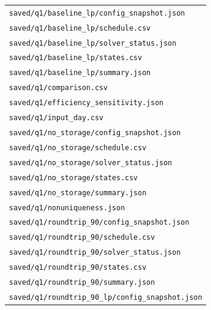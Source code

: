 \begin{longtable}{p{}}
\nolinkurl{saved/q1/baseline_lp/config_snapshot.json} \\

\nolinkurl{saved/q1/baseline_lp/schedule.csv} \\

\nolinkurl{saved/q1/baseline_lp/solver_status.json} \\

\nolinkurl{saved/q1/baseline_lp/states.csv} \\

\nolinkurl{saved/q1/baseline_lp/summary.json} \\

\nolinkurl{saved/q1/comparison.csv} \\

\nolinkurl{saved/q1/efficiency_sensitivity.json} \\

\nolinkurl{saved/q1/input_day.csv} \\

\nolinkurl{saved/q1/no_storage/config_snapshot.json} \\

\nolinkurl{saved/q1/no_storage/schedule.csv} \\

\nolinkurl{saved/q1/no_storage/solver_status.json} \\

\nolinkurl{saved/q1/no_storage/states.csv} \\

\nolinkurl{saved/q1/no_storage/summary.json} \\

\nolinkurl{saved/q1/nonuniqueness.json} \\

\nolinkurl{saved/q1/roundtrip_90/config_snapshot.json} \\

\nolinkurl{saved/q1/roundtrip_90/schedule.csv} \\

\nolinkurl{saved/q1/roundtrip_90/solver_status.json} \\

\nolinkurl{saved/q1/roundtrip_90/states.csv} \\

\nolinkurl{saved/q1/roundtrip_90/summary.json} \\

\nolinkurl{saved/q1/roundtrip_90_lp/config_snapshot.json} \\


\end{longtable}
